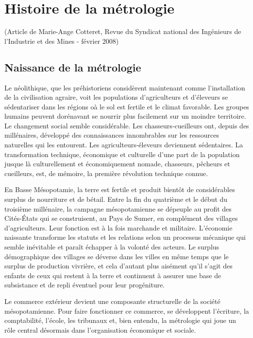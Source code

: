 \chapter{Histoire de la métrologie}

(Article de Marie-Ange Cotteret, Revue du Syndicat national des Ingénieurs de l'Industrie et des Mines - février 2008)

\sl

\section{Naissance de la métrologie}

Le néolithique, que les préhistoriens considèrent maintenant comme l'installation de la civilisation agraire, voit les populations d'agriculteurs et d'éleveurs se sédentariser dans les régions oà le sol est fertile et le climat favorable. Les groupes humains peuvent dorénavant se nourrir plus facilement sur un moindre territoire.  Le changement social semble considérable. Les chasseurs-cueilleurs ont, depuis des millénaires, développé des connaissances innombrables sur les ressources naturelles qui les entourent. Les agriculteurs-éleveurs deviennent sédentaires.  La transformation technique, économique et culturelle d'une part de la population jusque là culturellement et économiquement nomade, chasseurs, pêcheurs et cueilleurs, est, de mémoire, la première révolution technique connue.

En Basse Mésopotamie, la terre est fertile et produit bientôt de considérables surplus de nourriture et de bétail. Entre la fin du quatrième et le début du troisième millénaire, la campagne mésopotamienne se dépeuple au profit des Cités-États qui se construisent, au Pays de Sumer, en complément des villages d'agriculteurs.  Leur fonction est à la fois marchande et militaire.  L'économie naissante transforme les statuts et les relations selon un processus mécanique qui semble inévitable et paraît échapper à la volonté des acteurs. Le surplus démographique des villages se déverse dans les villes en même temps que le surplus de production vivrière, et cela d'autant plus aisément qu'il s'agit des enfants de ceux qui restent à la terre et continuent à assurer une base de subsistance et de repli éventuel pour leur progéniture.

Le commerce extérieur devient une composante structurelle de la société mésopotamienne. Pour faire fonctionner ce commerce, se développent l'écriture, la comptabilité, l'école, les tribunaux et, bien entendu, la métrologie qui joue un rôle central désormais dans l'organisation économique et sociale.

